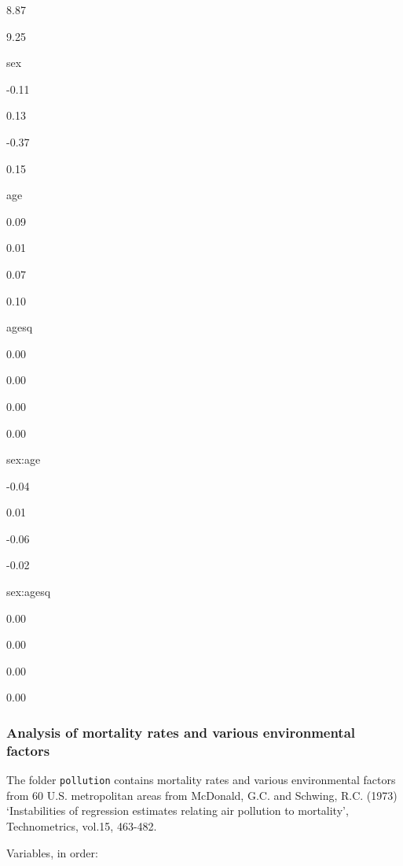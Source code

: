 \documentclass[]{article}
\begin{document}
8.87

9.25

sex

-0.11

0.13

-0.37

0.15

age

0.09

0.01

0.07

0.10

agesq

0.00

0.00

0.00

0.00

sex:age

-0.04

0.01

-0.06

-0.02

sex:agesq

0.00

0.00

0.00

0.00

\hypertarget{analysis-of-mortality-rates-and-various-environmental-factors}{%
\subsubsection{Analysis of mortality rates and various environmental
factors}\label{analysis-of-mortality-rates-and-various-environmental-factors}}

The folder \texttt{pollution} contains mortality rates and various
environmental factors from 60 U.S. metropolitan areas from McDonald,
G.C. and Schwing, R.C. (1973) `Instabilities of regression estimates
relating air pollution to mortality', Technometrics, vol.15, 463-482.

Variables, in order:
\end{document}

